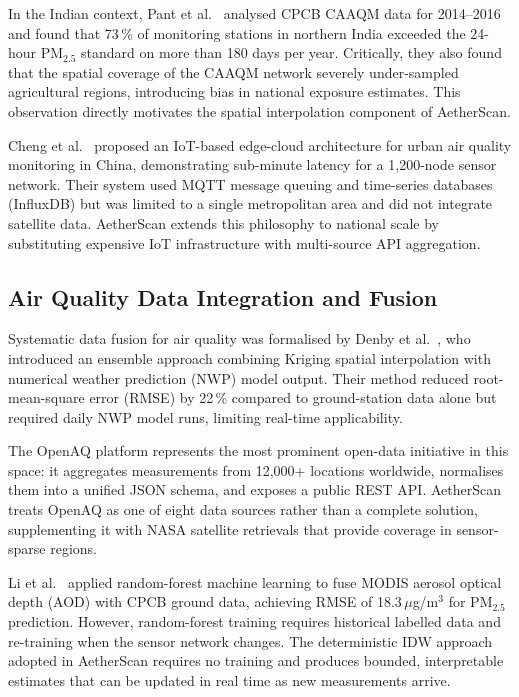 \documentclass[12pt,a4paper]{article}
\begin{document}
In the Indian context, Pant et al.~\cite{pant2017} analysed CPCB CAAQM data
for 2014--2016 and found that 73\,\% of monitoring stations in northern India
exceeded the 24-hour $\text{PM}_{2.5}$ standard on more than 180 days per year.
Critically, they also found that the spatial coverage of the CAAQM network
severely under-sampled agricultural regions, introducing bias in national
exposure estimates. This observation directly motivates the spatial
interpolation component of AetherScan.

Cheng et al.~\cite{cheng2021} proposed an IoT-based edge-cloud architecture
for urban air quality monitoring in China, demonstrating sub-minute latency
for a 1,200-node sensor network. Their system used MQTT message queuing and
time-series databases (InfluxDB) but was limited to a single metropolitan area
and did not integrate satellite data. AetherScan extends this philosophy to
national scale by substituting expensive IoT infrastructure with multi-source
API aggregation.

\subsection{Air Quality Data Integration and Fusion}
\label{sec:litreview:fusion}

Systematic data fusion for air quality was formalised by Denby et al.~\cite{denby2011},
who introduced an ensemble approach combining Kriging spatial interpolation with
numerical weather prediction (NWP) model output. Their method reduced root-mean-square
error (RMSE) by 22\,\% compared to ground-station data alone but required daily
NWP model runs, limiting real-time applicability.

The OpenAQ platform \cite{openaq2016} represents the most prominent open-data
initiative in this space: it aggregates measurements from 12,000+ locations
worldwide, normalises them into a unified JSON schema, and exposes a public
REST API. AetherScan treats OpenAQ as one of eight data sources rather than
a complete solution, supplementing it with NASA satellite retrievals that
provide coverage in sensor-sparse regions.

Li et al.~\cite{li2020} applied random-forest machine learning to fuse MODIS
aerosol optical depth (AOD) with CPCB ground data, achieving RMSE of
18.3\,$\mu$g/m$^{3}$ for $\text{PM}_{2.5}$ prediction. However, random-forest
training requires historical labelled data and re-training when the sensor
network changes. The deterministic IDW approach adopted in AetherScan requires
no training and produces bounded, interpretable estimates that can be updated
in real time as new measurements arrive.
\end{document}
